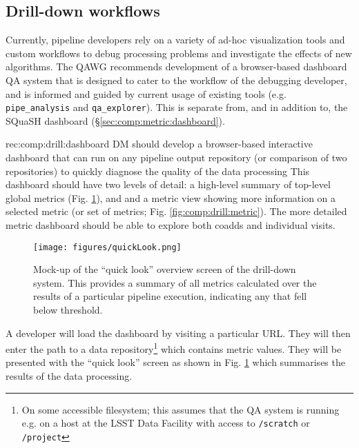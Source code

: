 \subsection{Drill-down workflows}
\label{sec:comp:drill}

Currently, pipeline developers rely on a variety of ad-hoc visualization tools and custom workflows to debug processing problems and investigate the effects of new algorithms.
The QAWG recommends development of a browser-based dashboard QA system that is designed to cater to the workflow of the debugging developer, and is informed and guided by current usage of existing tools (e.g. \texttt{pipe\_analysis} and \texttt{qa\_explorer}).
This is separate from, and in addition to, the SQuaSH dashboard (\S \ref{sec:comp:metric:dashboard}).

\begin{recommendation}
  {rec:comp:drill:dashboard}
  {DM should develop a browser-based interactive dashboard that can run on any pipeline output repository (or comparison of two repositories) to quickly diagnose the quality of the data processing}
  This dashboard should have two levels of detail: a high-level summary of top-level global metrics (Fig. \ref{fig:comp:drill:quick}), and and a metric view showing more information on a selected metric (or set of metrics; Fig. \ref{fig:comp:drill:metric}).
  The more detailed metric dashboard should be able to explore both coadds and individual visits.
\end{recommendation}

\begin{figure}
  \begin{center}
    \texttt{[image: figures/quickLook.png]}
  \end{center}
  \caption{
    Mock-up of the ``quick look'' overview screen of the drill-down system.
    This provides a summary of all metrics calculated over the results of a particular pipeline execution, indicating any that fell below threshold.
  }
  \label{fig:comp:drill:quick}
\end{figure}

A developer will load the dashboard by visiting a particular URL.
They will then enter the path to a data repository\footnote{On some accessible filesystem; this assumes that the QA system is running e.g. on a host at the LSST Data Facility with access to \texttt{/scratch} or \texttt{/project}} which contains metric values.
They will be presented with the ``quick look'' screen as shown in Fig. \ref{fig:comp:drill:quick} which summarises the results of the data processing.

